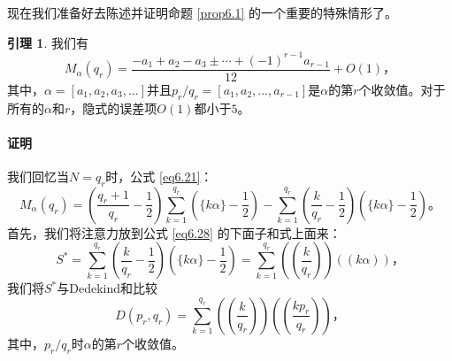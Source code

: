 \documentclass[11pt,a4paper]{article}
\theoremstyle{definition}
\newtheorem{lemma}{\textbf{引理}}[section]
\newcommand{\refeq}[1]{公式 \ref{#1}}
\newcommand{\refprop}[1]{命题 \ref{#1}}
\numberwithin{equation}{section}
\newcommand{\comma}{\text{，}}
\newcommand{\juhao}{\text{。}}
\newcommand{\ddbrace}[1]{\left(\left(#1\right)\right)}
\begin{document}
现在我们准备好去陈述并证明\refprop{prop6.1} 的一个重要的特殊情形了。
\begin{lemma}\label{lmm6.3}
	我们有
	\begin{equation}\label{eq6.27}
	M_{\alpha}\left(q_{r}\right)=\dfrac{-a_{1}+a_{2}-a_{3}\pm\cdots+\left(-1\right)^{r-1}a_{r-1}}{12}+O\left(1\right)\comma
	\end{equation}
	其中，$ \alpha=\left[a_{1},a_{2},a_{3},\ldots\right] $并且$ p_{r}/q_{r}=\left[a_{1},a_{2},\ldots,a_{r-1}\right] $是$ \alpha $的第$ r $个收敛值。对于所有的$ \alpha $和$ r $，隐式的误差项$ O\left(1\right) $都小于$ 5 $。
\end{lemma}

\paragraph{证明} 我们回忆当$ N=q_{r} $时，\refeq{eq6.21}：
\begin{equation}\label{eq6.28}
M_{\alpha}\left(q_{r}\right)=\left(\dfrac{q_{r}+1}{q_{r}}-\dfrac{1}{2}\right)\sum_{k=1}^{q_{r}}\left(\lbrace k\alpha\rbrace-\dfrac{1}{2}\right)-\sum_{k=1}^{q_{r}}\left(\dfrac{k}{q_{r}}-\dfrac{1}{2}\right)\left(\lbrace k\alpha\rbrace-\dfrac{1}{2}\right)\juhao
\end{equation}
首先，我们将注意力放到\refeq{eq6.28} 的下面子和式上面来：
\begin{equation}\label{eq6.29}
S^{\ast}=\sum_{k=1}^{q_{r}}\left(\dfrac{k}{q_{r}}-\dfrac{1}{2}\right)\left(\lbrace k\alpha\rbrace-\dfrac{1}{2}\right)=\sum_{k=1}^{q_{r}}\ddbrace{\dfrac{k}{q_{r}}}\ddbrace{k\alpha}\comma
\end{equation}
我们将$ S^{\ast} $与Dedekind和比较
\begin{equation}\label{eq6.30}
D\left(p_{r},q_{r}\right)=\sum_{k=1}^{q_{r}}\ddbrace{\dfrac{k}{q_{r}}}\ddbrace{\dfrac{kp_{r}}{q_{r}}}\comma
\end{equation}
其中，$ p_{r}/q_{r} $时$ \alpha $的第$ r $个收敛值。
\end{document}
